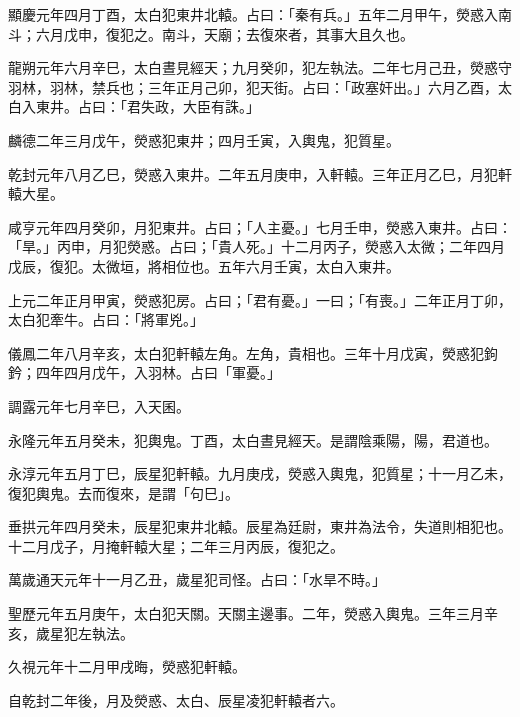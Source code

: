 \begin{pinyinscope}
 顯慶元年四月丁酉，太白犯東井北轅。占曰：「秦有兵。」五年二月甲午，熒惑入南斗；六月戊申，復犯之。南斗，天廟；去復來者，其事大且久也。



 龍朔元年六月辛巳，太白晝見經天；九月癸卯，犯左執法。二年七月己丑，熒惑守羽林，羽林，禁兵也；三年正月己卯，犯天街。占曰：「政塞奸出。」六月乙酉，太白入東井。占曰：「君失政，大臣有誅。」



 麟德二年三月戊午，熒惑犯東井；四月壬寅，入輿鬼，犯質星。



 乾封元年八月乙巳，熒惑入東井。二年五月庚申，入軒轅。三年正月乙巳，月犯軒轅大星。



 咸亨元年四月癸卯，月犯東井。占曰；「人主憂。」七月壬申，熒惑入東井。占曰：「旱。」丙申，月犯熒惑。占曰；「貴人死。」十二月丙子，熒惑入太微；二年四月戊辰，復犯。太微垣，將相位也。五年六月壬寅，太白入東井。



 上元二年正月甲寅，熒惑犯房。占曰；「君有憂。」一曰；「有喪。」二年正月丁卯，太白犯牽牛。占曰：「將軍兇。」



 儀鳳二年八月辛亥，太白犯軒轅左角。左角，貴相也。三年十月戊寅，熒惑犯鉤鈐；四年四月戊午，入羽林。占曰「軍憂。」



 調露元年七月辛巳，入天囷。



 永隆元年五月癸未，犯輿鬼。丁酉，太白晝見經天。是謂陰乘陽，陽，君道也。



 永淳元年五月丁巳，辰星犯軒轅。九月庚戌，熒惑入輿鬼，犯質星；十一月乙未，復犯輿鬼。去而復來，是謂「句巳」。



 垂拱元年四月癸未，辰星犯東井北轅。辰星為廷尉，東井為法令，失道則相犯也。十二月戊子，月掩軒轅大星；二年三月丙辰，復犯之。



 萬歲通天元年十一月乙丑，歲星犯司怪。占曰：「水旱不時。」



 聖歷元年五月庚午，太白犯天關。天關主邊事。二年，熒惑入輿鬼。三年三月辛亥，歲星犯左執法。



 久視元年十二月甲戌晦，熒惑犯軒轅。



 自乾封二年後，月及熒惑、太白、辰星凌犯軒轅者六。




\end{pinyinscope}
